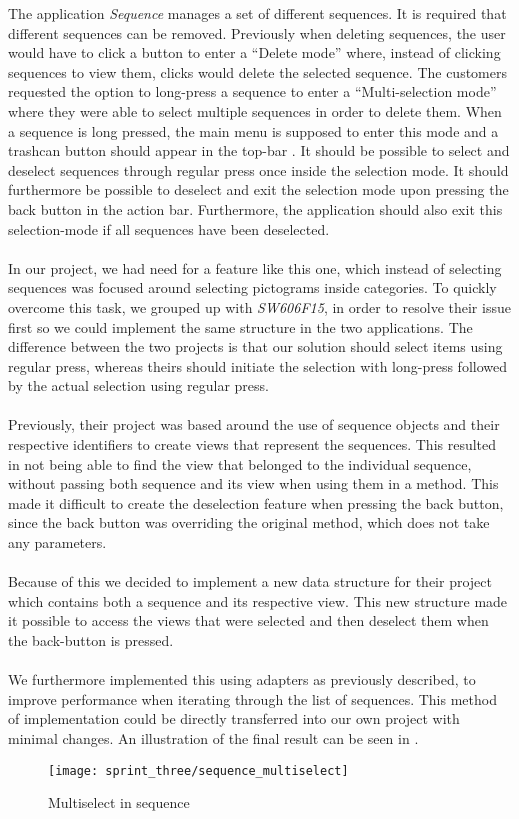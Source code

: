The application \emph{Sequence} manages a set of different sequences. It is required that different sequences can be removed. Previously when deleting sequences, the user would have to click a button to enter a ``Delete mode'' where, instead of clicking sequences to view them, clicks would delete the selected sequence. The customers requested the option to long-press a sequence to enter a ``Multi-selection mode'' where they were able to select multiple sequences in order to delete them. When a sequence is long pressed, the main menu is supposed to enter this mode and a trashcan button should appear in the top-bar \parencite{android_guidelines_longpress}. It should be possible to select and deselect sequences through regular press once inside the selection mode. It should furthermore be possible to deselect and exit the selection mode upon pressing the back button in the action bar. Furthermore, the application should also exit this selection-mode if all sequences have been deselected. 
\\\\ 
In our project, we had need for a feature like this one, which instead of selecting sequences was focused around selecting pictograms inside categories. To quickly overcome this task, we grouped up with \emph{SW606F15}, in order to resolve their issue first so we could implement the same structure in the two applications. The difference between the two projects is that our solution should select items using regular press, whereas theirs should initiate the selection with long-press followed by the actual selection using regular press.
\\\\
Previously, their project was based around the use of sequence objects and their respective identifiers to create views that represent the sequences. This resulted in not being able to find the view that belonged to the individual sequence, without passing both sequence and its view when using them in a method. This made it difficult to create the deselection feature when pressing the back button, since the back button was overriding the original  method, which does not take any parameters.
\\\\ 
Because of this we decided to implement a new data structure for their project which contains both a sequence and its respective view. This new structure made it possible to access the views that were selected and then deselect them when the back-button is pressed. 
\\\\
We furthermore implemented this using adapters as previously described, to improve performance when iterating through the list of sequences. This method of implementation could be directly transferred into our own project with minimal changes. An illustration of the final result can be seen in .

\begin{figure}[!htbp]
	\centering
	\texttt{[image: sprint\_three/sequence\_multiselect]}
	\caption{Multiselect in sequence}
	\label{fig:sequence_multiselect}
\end{figure}